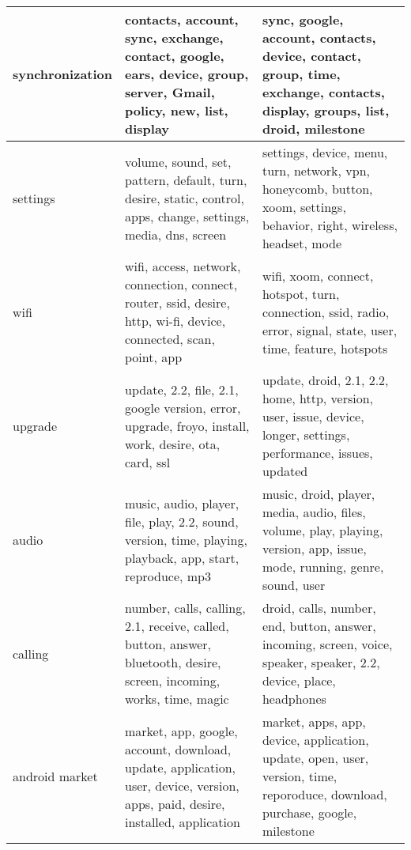 \begin{table*}[!htb]
\begin{tabular}{|m{1.75cm}<{\centering}||m{7.33cm}<{\centering}||m{7.33cm}<{\centering}|}
synchronization
&
contacts,  account,  sync,  exchange,  contact,  
google,  ears,  device,  group,  server,  
Gmail,  policy,  new,  list,  display 
&
sync,  google,  account,  contacts,  device, 
contact,  group,  time,  exchange,  contacts, 
display,  groups,  list,  droid,  milestone
\\ \hline

settings
&
volume,  sound,  set,  pattern,  default,  
turn,  desire,  static,  control,  apps,  
change,  settings,  media,  dns,  screen 
&

settings,  device,  menu,  turn,  network, 
vpn,  honeycomb,  button,  xoom,  settings, 
behavior,  right,  wireless,  headset,  mode
\\ \hline


wifi
&
wifi,  access,  network,  connection,  connect,  
  router,  ssid,  desire,  http,  wi-fi,  
    device,  connected,  scan,  point,  app 
&
wifi,  xoom,  connect,  hotspot,  turn, 
 connection,  ssid,  radio,  error, signal, 
state,  user,  time,  feature, hotspots
\\ \hline

upgrade
&
update,  2.2,  file,  2.1,  google 
  version,  error,  upgrade,  froyo,  install,  
  work,  desire,  ota,  card,  ssl 
&
update,  droid,  2.1, 2.2,  home, 
http,  version,  user,  issue,  device, 
longer,  settings,  performance,  issues,  updated
\\ \hline

audio
&
music,  audio,  player,  file,  play,  
  2.2, sound,  version,  time,  playing,  
  playback,  app,  start,  reproduce,  mp3 
&
music,  droid,  player,  media,  audio, 
files,  volume,  play,  playing,  version, 
 app,  issue,  mode,  running,  genre,  sound,  user
\\ \hline

calling
&
number,  calls,  calling,  2.1,  receive,  
called,  button,  answer,  bluetooth,  desire,  
screen,  incoming,  works,  time,  magic 
&
droid,  calls,  number,  end,  button, 
answer,  incoming,  screen,  voice,  speaker, 
speaker,  2.2,  device,  place,  headphones
\\ \hline

android market
&
market,  app,  google,  account,  download,  
update,  application,  user,  device,  version,  
apps,  paid,  desire,  installed,  application 
&
market,  apps,  app,  device,  application, 
update,  open,  user,  version,  time, 
reporoduce,  download,  purchase,  google,  milestone
\\ \hline


\end{tabular}
\end{table*}
